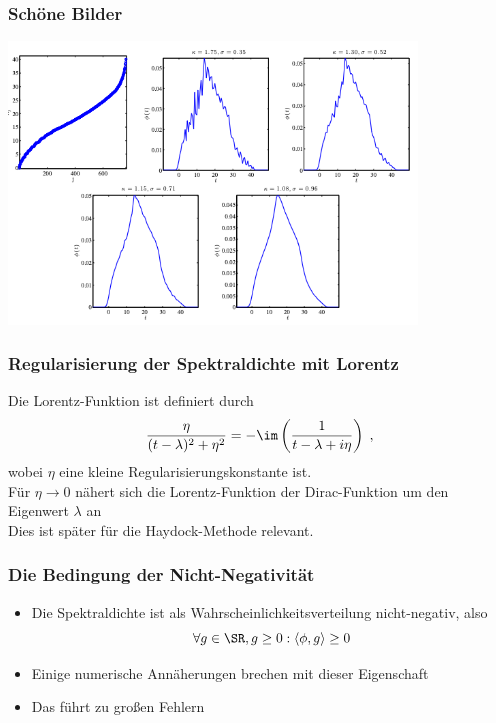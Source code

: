 \begin{frame}
    \frametitle{Schöne Bilder}
    \includegraphics[height=7.5cm]{screenshot.png}
\end{frame}

\begin{frame}
    \frametitle{Regularisierung der Spektraldichte mit Lorentz}
    Die Lorentz-Funktion ist definiert durch
    $$\frac{\eta}{(t - \lambda)^2 + \eta^2} = -\im \left( \frac{1}{t - \lambda + i \eta} \right) \; ,$$
    wobei $\eta$ eine kleine Regularisierungskonstante ist.\\
    Für $\eta \to 0$ nähert sich die Lorentz-Funktion der Dirac-Funktion um den Eigenwert $\lambda$ an\\
    Dies ist später für die Haydock-Methode relevant.
\end{frame}

\begin{frame}
    \frametitle{Die Bedingung der Nicht-Negativität}
    \begin{itemize}
        \item Die Spektraldichte ist als Wahrscheinlichkeitsverteilung nicht-negativ, also
        $$\forall g \in \SR, g \geq 0: \langle \phi, g \rangle \geq 0$$
        \item Einige numerische Annäherungen brechen mit dieser Eigenschaft
        \item Das führt zu großen Fehlern
    \end{itemize}
\end{frame}